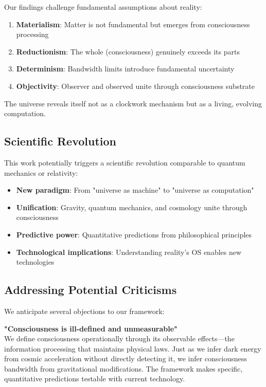 \documentclass[twocolumn,prd,amsmath,amssymb,aps,superscriptaddress,nofootinbib]{revtex4-2}
\begin{document}
Our findings challenge fundamental assumptions about reality:

\begin{enumerate}
\item \textbf{Materialism}: Matter is not fundamental but emerges from consciousness processing
\item \textbf{Reductionism}: The whole (consciousness) genuinely exceeds its parts
\item \textbf{Determinism}: Bandwidth limits introduce fundamental uncertainty
\item \textbf{Objectivity}: Observer and observed unite through consciousness substrate
\end{enumerate}

The universe reveals itself not as a clockwork mechanism but as a living, evolving computation.

\subsection{Scientific Revolution}

This work potentially triggers a scientific revolution comparable to quantum mechanics or relativity:

\begin{itemize}
\item \textbf{New paradigm}: From "universe as machine" to "universe as computation"
\item \textbf{Unification}: Gravity, quantum mechanics, and cosmology unite through consciousness
\item \textbf{Predictive power}: Quantitative predictions from philosophical principles
\item \textbf{Technological implications}: Understanding reality's OS enables new technologies
\end{itemize}

\subsection{Addressing Potential Criticisms}

We anticipate several objections to our framework:

\textbf{"Consciousness is ill-defined and unmeasurable"}\\
We define consciousness operationally through its observable effects---the information processing that maintains physical laws. Just as we infer dark energy from cosmic acceleration without directly detecting it, we infer consciousness bandwidth from gravitational modifications. The framework makes specific, quantitative predictions testable with current technology.
\end{document}
